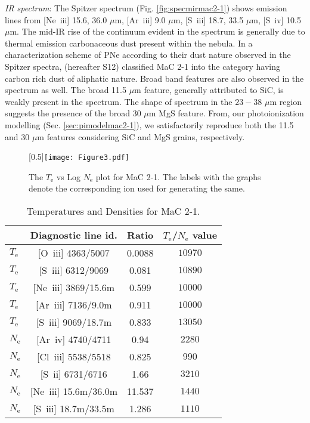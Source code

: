\documentclass[a4paper,fleqn,usenatbib]{mnras}
\begin{document}
{\textit{IR spectrum}:} The Spitzer spectrum (Fig. \ref{fig:specmirmac2-1}) shows emission lines from [Ne~{\sc iii}] 15.6, 36.0 $\mu$m, [Ar~{\sc iii}] 9.0 $\mu$m, [S~{\sc iii}] 18.7, 33.5 $\mu$m, [S~{\sc iv}] 10.5 $\mu$m. The mid-IR rise of the continuum evident in the spectrum is generally due to thermal emission carbonaceous dust present within the nebula. In a characterization scheme of PNe according to their dust nature observed in the Spitzer spectra, \citet{2012ApJ...753..172S} (hereafter S12) classified MaC 2-1 into the category having carbon rich dust of aliphatic nature. Broad band features are also observed in the spectrum as well. The broad 11.5 $\mu$m feature, generally attributed to SiC, is weakly present in the spectrum. The shape of spectrum in the $23-38$ $\mu$m region suggests the presence of the broad 30 $\mu$m MgS feature. From, our photoionization modelling (Sec. \ref{sec:pimodelmac2-1}), we satisfactorily reproduce both the 11.5 and 30 $\mu$m features considering SiC and MgS grains, respectively.

\begin{figure}
\scalebox{0.5}[0.5]{\texttt{[image: Figure3.pdf]}}
 \caption{The $T_\mathrm{e}$ vs Log $N_\mathrm{e}$ plot for MaC 2-1. The labels with the graphs denote the corresponding ion used for generating the same. \label{fig:tenemac2-1}}
\end{figure}

\begin{table}
\centering
\small
\caption{Temperatures and Densities for MaC 2-1. \label{tab:tenemac2-1}}
 \begin{tabular}{lccc}
 \hline
& Diagnostic line id. & Ratio & $T_\mathrm{e}$/$N_\mathrm{e}$ value\\
 \hline
$T_\mathrm{e}$ & [O~{\sc iii}] 4363/5007 & 0.0088 & ${10970}$\\
$T_\mathrm{e}$ & [S~{\sc iii}] 6312/9069 & 0.081 & ${10890}$\\
$T_\mathrm{e}$ & [Ne~{\sc iii}] 3869/15.6m & 0.599 & ${10000}$\\
$T_\mathrm{e}$ & [Ar~{\sc iii}] 7136/9.0m & 0.911 & ${10000}$\\
$T_\mathrm{e}$ & [S~{\sc iii}] 9069/18.7m & 0.833 & ${13050}$\\
 \hline
$N_\mathrm{e}$ & [Ar~{\sc iv}] 4740/4711 & 0.94 & ${2280}$\\
$N_\mathrm{e}$ & [Cl~{\sc iii}] 5538/5518 & 0.825 & ${990}$\\
$N_\mathrm{e}$ & [S~{\sc ii}] 6731/6716 & 1.66 & ${3210}$\\
$N_\mathrm{e}$ & [Ne~{\sc iii}] 15.6m/36.0m & 11.537 & ${1440}$\\
$N_\mathrm{e}$ & [S~{\sc iii}] 18.7m/33.5m & 1.286 & ${1110}$\\
 \hline
 \end{tabular}
\end{table} 
\end{document}
